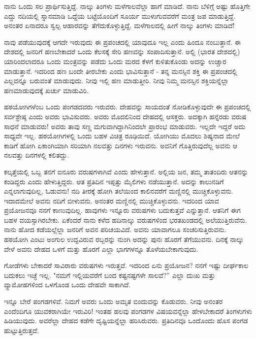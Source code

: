 ನಾನು ಒಂದು ಸಲ ಪ್ರಾರ್ಥಿಸುತ್ತಿದ್ದೆ. ನಾಲ್ಕು ತಿಂಗಳು ಮಳೆಗಾಲವೆಲ್ಲಾ ಹಾಗೆ ಮಾಡಿದೆ. ನಾನು ಬೆಳಿಗ್ಗೆ ಅಷ್ಟು ಹೊತ್ತಿಗೇ ಎದ್ದು ನದಿಯಲ್ಲಿ ಸ್ನಾನಮಾಡಿ ಒದ್ದೆಯ ಬಟ್ಟೆಯೊಂದಿಗೆ ಸೂರ್ಯ ಮುಳುಗುವವರೆಗೆ ಮಂತ್ರ ಜಪ ಮಾಡುತ್ತಿದ್ದೆ. ಅನಂತರ ಏನಾದರೂ ಸ್ವಲ್ಪ ಆಹಾರವನ್ನು ತೆಗೆದುಕೊಳ್ಳುತ್ತಿದ್ದೆ. ಮಳೆಗಾಲದಲ್ಲಿ ಹೀಗೆ ನಾಲ್ಕು ತಿಂಗಳು ಮಾಡಿದೆ!

ನಾವು ಪಡೆಯುವುದಕ್ಕೆ ಆಗದೇ ಇರುವುದು ಈ ಪ್ರಪಂಚದಲ್ಲಿ ಯಾವುದೂ ಇಲ್ಲ ಎಂದು ಹಿಂದೂ ನಂಬುತ್ತಾನೆ. ಈ ದೇಶದಲ್ಲಿ ಜನರಿಗೆ ಹಣಬೇಕಾದರೆ ಒಂದು ಕೆಲಸಕ್ಕೆ ಸೇರಿ ಹಣವನ್ನು ಸಂಪಾದಿಸುತ್ತಾನೆ. ಅಲ್ಲಿ (ಭಾರತ ದೇಶದಲ್ಲಿ) ಯಾರಿಂದಲಾದರೂ ಒಂದು ಮಂತ್ರವನ್ನು ಪಡೆದು ಒಂದು ಮರದ ಕೆಳಗೆ ಕುಳಿತುಕೊಂಡು ಅದನ್ನು ಉಚ್ಚಾರ ಮಾಡುತ್ತಾನೆ. ಇದರಿಂದ ಹಣ ಬಂದೇ ತೀರಬೇಕು ಎಂದು ಭಾವಿಸುತ್ತಾನೆ - ತನ್ನ ಮನಸ್ಸಿನ ಶಕ್ತಿ ಈ ಪ್ರಪಂಚದಲ್ಲಿ ಎಲ್ಲವನ್ನೂ ಬರುವಂತೆ ಮಾಡುವುದು. ನೀವು ಇಲ್ಲಿ ಹಣ ಮಾಡುತ್ತೀರಿ. ನೀವು ನಿಮ್ಮ ಮನಸ್ಸಿನ ಶಕ್ತಿಯನ್ನೆಲ್ಲಾ ಹಣಮಾಡುವುದಕ್ಕೆ ಖರ್ಚು ಮಾಡುವಿರಿ.

ಹಠಯೋಗಿಗಳೆಂಬ ಒಂದು ಪಂಗಡದವರು ಇರುವರು. ದೇಹವನ್ನು ಸಾಯದಂತೆ ನೋಡಿಕೊಳ್ಳುವುದೇ ಈ ಪ್ರಪಂಚದಲ್ಲಿ ಸರ್ವಶ್ರೇಷ್ಠ ಎಂದು ಅವರು ಭಾವಿಸುವರು. ಅವರು ಮೊದಲಿನಿಂದ ದೇಹದಲ್ಲಿ ಆಸಕ್ತರು. ಅದಕ್ಕಾಗಿ ಹನ್ನೆರಡು ವರುಷ ಸಾಧನೆ ಮಾಡುವರು! ಅವರು ತಾವು ಸಣ್ಣ ಮಗುವಾಗಿದ್ದಾಗಿನಿಂದಲೇ ಪ್ರಾರಂಭ ಮಾಡುವರು. ಇಲ್ಲದೇ ಇದ್ದರೆ ಅದು ಸಾಧ್ಯವೇ ಇಲ್ಲ. ಹಠಯೋಗಿಗಳಲ್ಲಿ ಒಂದು ಬಹಳ ವಿಚಿತ್ರ ರೂಢಿಯಿದೆ. ಯೋಗಿಯು ಮೊದಲು ಶಿಷ್ಯನಾದ ಮೇಲೆ ಕಾಡಿಗೆ ಹೋಗಿ ಏಕಾಂಗಿಯಾಗಿ ಸರಿಯಾಗಿ ನಲವತ್ತು ದಿನಗಳು ಇರುವನು. ಅವನಿಗೆ ಗೊತ್ತಿರುವುದೆಲ್ಲ ಅವನು ಆ ನಲವತ್ತು ದಿನಗಳಲ್ಲಿ ಕಲಿತದ್ದು.

ಕಲ್ಕತ್ತೆಯಲ್ಲಿ ಒಬ್ಬ ತನಗೆ ಐನೂರು ವರುಷಗಳಾಗಿವೆ ಎಂದು ಹೇಳುತ್ತಾನೆ. ಅಲ್ಲಿಯ ಜನ, ತಮ್ಮ ತಾತಂದಿರು ಆತನನ್ನು ಕಂಡಿದ್ದರು ಎಂದು ಹೇಳುತ್ತಿದ್ದರು. ಆತ ಪ್ರತಿದಿನ ಇಪ್ಪತ್ತು ಮೈಲಿಗಳು ನಡೆಯುತ್ತಾನೆ. ಅದನ್ನು ಕಾಲುನಡಿಗೆ ಎನ್ನಲಾಗುವುದಿಲ್ಲ, ಓಡುವನು! ನದಿ ತೀರಕ್ಕೆ ಹೋಗಿ ತಲೆಯಿಂದ ಕಾಲಿನವರೆಗೆ ಮಣ್ಣಿನಲ್ಲಿ ಮುಚ್ಚಿಕೊಳ್ಳುವನು. ಇದಾದಮೇಲೆ ಅವನು ನದಿಗೆ ಬೀಳುವನು. ಅನಂತರ ಮಣ್ಣಿನಲ್ಲಿ ಮುಚ್ಚಿಕೊಳ್ಳುವನು. ಇದರಿಂದ ಯಾವ ಪ್ರಯೋಜನವೂ ನನಗೆ ಕಾಣುವುದಿಲ್ಲ. ಹಾವುಗಳು ಇನ್ನೂರು ವರುಷಗಳು ಬದುಕುತ್ತವೆ ಎನ್ನುತ್ತಾನೆ. ಆತನಿಗೆ ಈಗ ಬಹಳ ವಯಸ್ಸಾಗಿರಬೇಕು. ಏಕೆಂದರೆ ನಾನು ಕಳೆದ ಹದಿನಾಲ್ಕು ವರುಷಗಳಿಂದ ಭರತಖಂಡದಲ್ಲಿ ಅಲೆಯುತ್ತಿರುವೆನು. ನಾನು ಹೋದ ಕಡೆಯಲ್ಲೆಲ್ಲಾ ಜನರಿಗೆ ಅವನ ಪರಿಚಯವಿದೆ. ಅವನು ಯಾವಾಗಲೂ ಸಂಚರಿಸುತ್ತಿರುವನು. ಹಠಯೋಗಿ ಎಂಟು ಅಂಗುಲ ಉದ್ದವಿರುವ ರಬ್ಬರನ್ನು ನುಂಗಿ ಅದನ್ನು ಪುನಃ ಹೊರಗೆ ತೆಗೆಯುವನು. ದಿನಕ್ಕೆ ನಾಲ್ಕು ವೇಳೆ ಅವನು ದೇಹದ ಒಳಗೆ ಮತ್ತು ಹೊರಗೆ ಎಲ್ಲಾ ಭಾಗಗಳನ್ನೂ ತೊಳೆಯಬೇಕಾಗುವುದು.

ಗೋಡೆಗಳು ಬೇಕಾದರೆ ಸಾವಿರಾರು ವರುಷಗಳು ಇರುತ್ತವೆ. ಇದರಿಂದ ಏನು ಪ್ರಯೋಜನ? ನನಗೆ ಇಷ್ಟು ದೀರ್ಘಕಾಲ ಬದುಕಲು ಇಚ್ಛೆ ಇಲ್ಲ. "ನಮಗೆ ಇಲ್ಲಿಯವರೆಗೆ ಬಂದ ಕಷ್ಟನಷ್ಟಗಳೇ ಸಾಲವೆ?” ಎಲ್ಲಾ ದುಃಖ ಮತ್ತು ವ್ಯಾಮೋಹಗಳಿಂದ ಒಳಗೊಂಡ ಒಂದು ದೇಹವೇ ಸಾಕಾಗಿದೆ.

ಇನ್ನೂ ಬೇರೆ ಪಂಗಡಗಳಿವೆ. ನಿಮಗೆ ಅವರು ಒಂದು ಅಮೃತ ಬಿಂದುವನ್ನು ಕೊಡುವರು. ನೀವು ಅನಂತರ ಎಂದೆಂದಿಗೂ ಯುವಕರಾಗಿಯೇ ಇರುವಿರಿ! ಇಂತಹ ಹಲವು ಪಂಗಡಗಳ ವಿಷಯವನ್ನೆಲ್ಲಾ ಹೇಳಬೇಕಾದರೆ ತಿಂಗಳುಗಳು ಹಿಡಿಯುವುದು. ಅವರೆಲ್ಲಾ ದೇಹದ ಕಡೆಗೇ ದೃಷ್ಟಿಯನ್ನೆಲ್ಲಾ ಹರಿಸಿರುವರು. ಪ್ರತಿದಿನವೂ ಒಂದೊಂದು ಹೊಸ ಪಂಗಡ ಹುಟ್ಟುತ್ತಿರುತ್ತದೆ.

